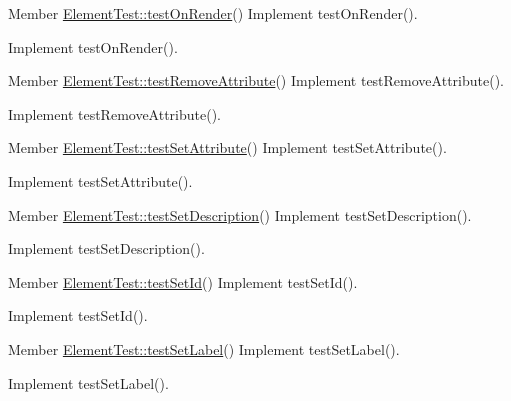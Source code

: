 \begin{DoxyDescription}
\item[Member \hyperlink{class_element_test_a4e08951cd939e547553c08ee5290ac1f}{ElementTest::testOnRender}() ]Implement testOnRender().

Implement testOnRender().
\end{DoxyDescription}

\label{todo__todo000123}
\hypertarget{todo__todo000123}{}
 
\begin{DoxyDescription}
\item[Member \hyperlink{class_element_test_a89c6d6773794f968de1ff4e0f4cc4d1c}{ElementTest::testRemoveAttribute}() ]Implement testRemoveAttribute().

Implement testRemoveAttribute().
\end{DoxyDescription}

\label{todo__todo000124}
\hypertarget{todo__todo000124}{}
 
\begin{DoxyDescription}
\item[Member \hyperlink{class_element_test_a3e0f9ad1fc54e41c11bc5adeec46acc9}{ElementTest::testSetAttribute}() ]Implement testSetAttribute().

Implement testSetAttribute().
\end{DoxyDescription}

\label{todo__todo000113}
\hypertarget{todo__todo000113}{}
 
\begin{DoxyDescription}
\item[Member \hyperlink{class_element_test_aa4a15c34620107dd431e86ad70441452}{ElementTest::testSetDescription}() ]Implement testSetDescription().

Implement testSetDescription().
\end{DoxyDescription}

\label{todo__todo000106}
\hypertarget{todo__todo000106}{}
 
\begin{DoxyDescription}
\item[Member \hyperlink{class_element_test_ab3dcacda3661269b9eaf705fd084f986}{ElementTest::testSetId}() ]Implement testSetId().

Implement testSetId().
\end{DoxyDescription}

\label{todo__todo000110}
\hypertarget{todo__todo000110}{}
 
\begin{DoxyDescription}
\item[Member \hyperlink{class_element_test_ac0b97eef14e1d3c09a7127674fae02a2}{ElementTest::testSetLabel}() ]Implement testSetLabel().

Implement testSetLabel().
\end{DoxyDescription}

